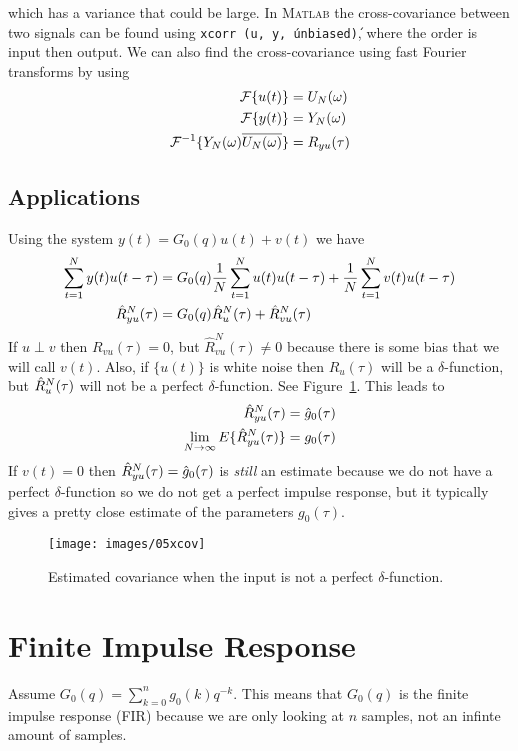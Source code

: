 which has a variance that could be large.
In \textsc{Matlab} the cross-covariance between two signals can be found using \texttt{xcorr (u, y, \'unbiased\')}, where the order is input then output.
We can also find the cross-covariance using fast Fourier transforms by using
\begin{align*}
\mathcal{F}\{u(t)\} &= U_N(\omega) \\
\mathcal{F}\{y(t)\} &= Y_N(\omega) \\
\mathcal{F}^{-1}\{Y_N(\omega)\overline{U_N(\omega)}\} &= R_{yu}(\tau)
\end{align*}

\subsection{Applications}
Using the system $y(t) = G_0(q)u(t)+v(t)$ we have
\begin{align*}
\sum_{t=1}^N y(t)u(t-\tau) &= G_0(q)\frac{1}{N}\sum_{t=1}^N u(t)u(t-\tau) + \frac{1}{N}\sum_{t=1}^N v(t)u(t-\tau) \\
\hat{R}_{yu}^N (\tau) &= G_0(q)\hat{R}_u^N (\tau) + \hat{R}_{vu}^N(\tau)
\end{align*}
If $u\perp v$ then $R_{vu}(\tau)=0$, but $\hat{R}_{vu}^N(\tau)\neq 0$ because there is some bias that we will call $v(t)$.
Also, if $\{u(t)\}$ is white noise then $R_u(\tau)$ will be a $\delta$-function, but $\hat{R}_u^N (\tau)$ will not be a perfect $\delta$-function.
See Figure~\ref{fig:05xcov}.
This leads to
\begin{align*}
\hat{R}_{yu}^N (\tau) &= \hat{g}_0(\tau) \\
\lim_{N\to\infty}E\{\hat{R}_{yu}^N (\tau)\} &= g_0(\tau)
\end{align*}
If $v(t)=0$ then $\hat{R}_{yu}^N (\tau)=\hat{g}_0(\tau)$ is \textit{still} an estimate because we do not have a perfect $\delta$-function so we do not get a perfect impulse response, but it typically gives a pretty close estimate of the parameters $g_0(\tau)$.
\begin{figure}[ht!]
\centering
\texttt{[image: images/05xcov]}
\caption{Estimated covariance when the input is not a perfect $\delta$-function.}%
\label{fig:05xcov}
\end{figure}

\section{Finite Impulse Response}
Assume $G_0(q) = \sum_{k=0}^n g_0(k)q^{-k}$.
This means that $G_0(q)$ is the finite impulse response (FIR) because we are only looking at $n$ samples, not an infinte amount of samples.

